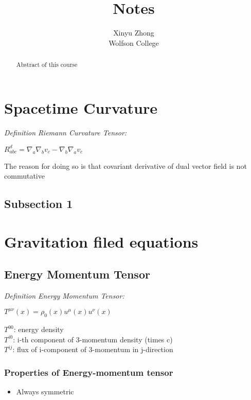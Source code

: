 \documentclass[12pt,a4paper]{article}
\author{Xinyu Zhong\\Wolfson College}
\title{Notes}
\newcommand{\definition}[3]
    {
    \textit{Definition #1: }
    \begin{center}
        {#2}
    \end{center}
    {#3}
    }
\begin{document}
\begin{titlepage}
    \maketitle
\end{titlepage}

\tableofcontents

\newpage

\begin{abstract}
\noindent
Abstract of this course
\end{abstract}


\section{Spacetime Curvature}
\definition{Riemann Curvature Tensor}
    {$R_{abc}^d=\nabla_a\nabla_b v_c-\nabla_b\nabla_a v_c$}
    {The reason for doing so is that covariant derivative of dual vector field is not commutative}
    \subsection{Subsection 1}
\section{Gravitation filed equations}
    \subsection{Energy Momentum Tensor}
    \definition{Energy Momentum Tensor}
        {$T^{\mu\nu}(x)=\rho_0(x) u^\mu(x) u^\nu(x)$}
        {
        $T^{00}$: energy density\\
        $T^{i0}$: i-th component of 3-momentum density (times c)\\
        $T^{ij}$: flux of i-component of 3-momentum in j-direction
        }
    \subsubsection{Properties of Energy-momentum tensor}
    \begin{itemize}
        \item Always symmetric
    \end{itemize}
\end{document}
